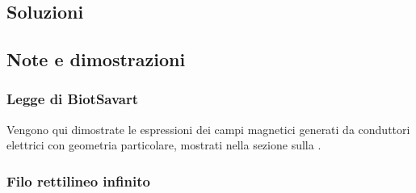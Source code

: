 \documentclass[letterpaper,10pt,italian]{jupyterBook}
\begin{document}
\sphinxstepscope


\subsection{Soluzioni}
\label{\detokenize{ch/electromagnetism/electromagnetism-steady-sol:soluzioni}}\label{\detokenize{ch/electromagnetism/electromagnetism-steady-sol:physics-hs-electromagnetism-electromagnetism-steady-sol}}\label{\detokenize{ch/electromagnetism/electromagnetism-steady-sol::doc}}
\sphinxstepscope


\subsection{Note e dimostrazioni}
\label{\detokenize{ch/electromagnetism/electromagnetism-steady-notes:note-e-dimostrazioni}}\label{\detokenize{ch/electromagnetism/electromagnetism-steady-notes:physics-hs-electromagnetism-electromagnetism-steady-notes}}\label{\detokenize{ch/electromagnetism/electromagnetism-steady-notes::doc}}

\subsubsection{Legge di Biot\sphinxhyphen{}Savart}
\label{\detokenize{ch/electromagnetism/electromagnetism-steady-notes:legge-di-biot-savart}}\label{\detokenize{ch/electromagnetism/electromagnetism-steady-notes:physics-hs-electromagnetism-electromagnetism-steady-notes-biot-savart}}
\sphinxAtStartPar
Vengono qui dimostrate le espressioni dei campi magnetici generati da conduttori elettrici con geometria particolare, mostrati nella sezione sulla {\hyperref[\detokenize{ch/electromagnetism/electromagnetism-steady:physics-hs-electromagnetism-electromagnetism-steady-biot-savart}]{}}.
\subsubsection*{Filo rettilineo infinito}
\end{document}
